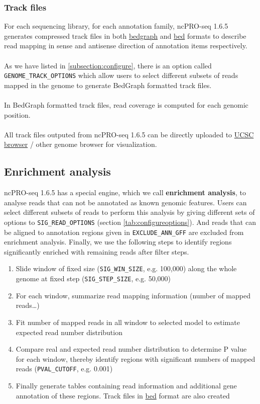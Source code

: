 \documentclass[12pt]{article}
\def \ncpip{ncPRO-seq 1.6.5}
\begin{document}
\subsubsection{Track files}
For each sequencing library,  for each annotation family, \ncpip{} generates compressed track files in both \href{http://genome.ucsc.edu/goldenPath/help/bedgraph.html}{bedgraph} and \href{http://genome.ucsc.edu/goldenPath/help/bed.html}{bed} formats to describe read mapping in sense and antisense direction of annotation items respectively. \\\\
As we have listed in \ref{subsection:configure}, there is an option called \verb+GENOME_TRACK_OPTIONS+ which allow users to select different subsets of reads mapped in the genome to generate BedGraph formatted track files.\\\\
In BedGraph formatted track files, read coverage is computed for each genomic position. \\\\
All track files outputed from \ncpip{} can be directly uploaded to \href{http://genome.ucsc.edu/index.html}{ UCSC browser} / other genome browser for visualization.

\subsection{Enrichment analysis}
\label{subsection:enrichmentanalysis}
\ncpip{} has a special engine, which we call \textbf{enrichment analysis}, to analyse reads that can not be annotated as known genomic features. Users can select different subsets of reads to perform this analysis by giving different sets of options to \verb+SIG_READ_OPTIONS+ (section \ref{tab:configureoptions}). And reads that can be aligned to annotation regions given in \verb+EXCLUDE_ANN_GFF+ are excluded from enrichment analysis. Finally, we use the following steps to identify regions significantly enriched with remaining reads after filter steps.

\begin{enumerate}
 \item Slide window of fixed size  (\verb+SIG_WIN_SIZE+, e.g. 100,000) along the whole genome at fixed step (\verb+SIG_STEP_SIZE+, e.g. 50,000)
 \item For each window, summarize read mapping information (number of mapped reads\ldots)
 \item Fit number of mapped reads in all window to selected model to estimate expected read number distribution
 \item Compare real and expected read number distribution to determine P value for each window, thereby identify regions with significant numbers of mapped reads (\verb+PVAL_CUTOFF+, e.g. 0.001)
 \item Finally generate tables containing read information and additional gene annotation of these regions. Track files in \href{http://genome.ucsc.edu/FAQ/FAQformat.html#format1}{bed} format are also created
\end{enumerate}
\end{document}
